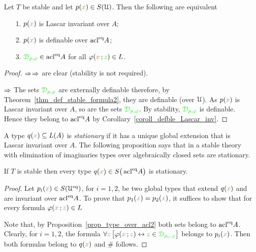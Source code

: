\documentclass[creche.tex]{subfiles}
\begin{document}
\begin{proposition}\label{prop_type_over_acl2} Let $T$ be stable and let $p({\color{brown} x})\in S(\EuScript U)$. Then the following are equivalent
\begin{itemize}
\item[1.] $p({\color{brown} x})$ is Lascar invariant over $A$;
\item[2.] $p({\color{brown} x})$ is definable over $\mathop{\rm acl}^{{\rm eq}}\!A$;
\item[3.] ${\color{green}\EuScript D_{p,\varphi}}\in \mathop{\rm acl}^{{\rm eq}}\!A$ for all $\varphi({\color{brown} x}\,;{\color{green} z})\in L$.
\end{itemize}
\end{proposition}
\begin{proof}
 $\Rightarrow$$\Rightarrow$ are clear (stability is not required).
 
 $\Rightarrow$ The sets ${\color{green}\EuScript D_{p,\varphi}}$ are externally definable therefore, by Theorem~\ref{thm_def_stable_formula2}, they are definable (over $\EuScript U$).
 As $p({\color{brown} x})$ is Lascar invariant over $A$, so are the sets ${\color{green}\EuScript D_{p,\varphi}}$.
 By stability, ${\color{green}\EuScript D_{p,\varphi}}$ is definable.
 Hence they belong to $\mathop{\rm acl}^{{\rm eq}}\!A$ by Corollary~\ref{coroll_defble_Lascar_inv}.
\end{proof}
% 

A type $q({\color{brown} x})\subseteq L(A)$ is \emph{stationary\/} if it has a unique global extension that is Lascar invariant over $A$.
The following proposition says that in a stable theory with elimination of imaginaries types over algebraically closed sets are stationary.

\begin{proposition}\label{prop_type_over_acl_stationary} If $T$ is stable then every type $q({\color{brown} x})\in S\big(\mathop{\rm acl}^{{\rm eq}}\!A\big)$ is stationary.
\end{proposition}

\begin{proof}
Let $p_i({\color{brown} x})\in S(\EuScript U^{{\rm eq}})$, for $i=1,2$, be two global types that extend $q({\color{brown} x})$ and are invariant over $\mathop{\rm acl}^{{\rm eq}}\!A$.
To prove that $p_1({\color{brown} x}) =p_2({\color{brown} x})$, it suffices to show that for every formula $\varphi({\color{brown} x}\,;{\color{green} z})\in L$


Note that, by Proposition~\ref{prop_type_over_acl2} both sets belong to  $\mathop{\rm acl}^{{\rm eq}}\!A$.
Clearly, for $i=1,2$, the formula $\forall{\color{green}z}\,\big[\varphi({\color{brown} x}\,;{\color{green} z})\leftrightarrow {\color{green}z}\in {\color{green}\EuScript D_{p_i,\,\varphi}}\big]$ belongs to $p_i({\color{brown} x})$.
Then both formulas belong to $q({\color{brown} x})$ and $\#$ follows.
\end{proof}
\end{document}
